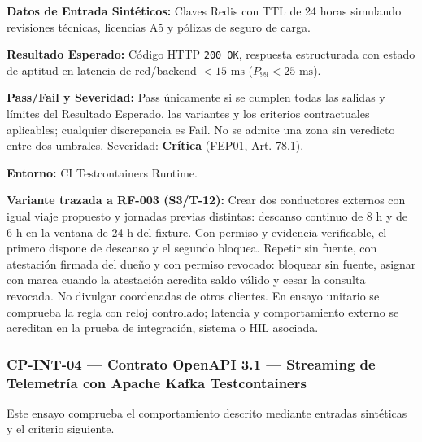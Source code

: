 \par\noindent\textbf{Datos de Entrada Sintéticos:} Claves Redis con TTL de 24 horas simulando revisiones técnicas, licencias A5 y pólizas de seguro de carga.\par
\par\noindent\textbf{Resultado Esperado:} Código HTTP \texttt{2\allowbreak{}0\allowbreak{}0\allowbreak{} O\allowbreak{}K\allowbreak{}}, respuesta estructurada con estado de aptitud en latencia de red/backend \(< 15\text{ ms}\) (\(P_{99} < 25\text{ ms}\)).\par
\par\noindent\textbf{Pass/Fail y Severidad:} Pass únicamente si se cumplen todas las salidas y límites del Resultado Esperado, las variantes y los criterios contractuales aplicables; cualquier discrepancia es Fail. No se admite una zona sin veredicto entre dos umbrales. Severidad: \textbf{Crítica} (FEP01, Art. 78.1).\par
\par\noindent\textbf{Entorno:} CI Testcontainers Runtime.\par







\par\noindent\textbf{Variante trazada a RF-003 (S3/T-12):} Crear dos conductores externos con igual viaje propuesto y jornadas previas distintas: descanso continuo de 8 h y de 6 h en la ventana de 24 h del fixture. Con permiso y evidencia verificable, el primero dispone de descanso y el segundo bloquea. Repetir sin fuente, con atestación firmada del dueño y con permiso revocado: bloquear sin fuente, asignar con marca cuando la atestación acredita saldo válido y cesar la consulta revocada. No divulgar coordenadas de otros clientes. En ensayo unitario se comprueba la regla con reloj controlado; latencia y comportamiento externo se acreditan en la prueba de integración, sistema o HIL asociada.\par
\subsubsection*{CP-INT-04 — Contrato OpenAPI 3.1 — Streaming de Telemetría con Apache Kafka Testcontainers}\label{sec:9-cp-int-04}
Este ensayo comprueba el comportamiento descrito mediante entradas sintéticas y el criterio siguiente.

